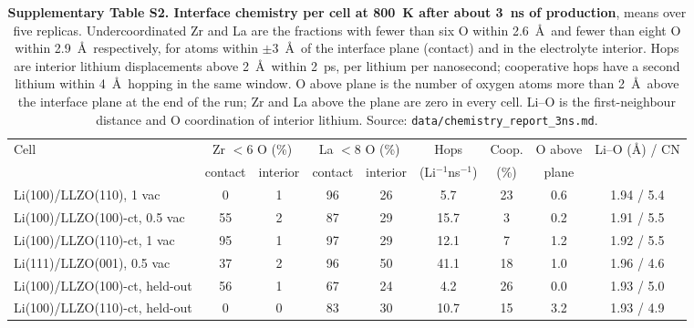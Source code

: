 \begin{table}[htbp]
\centering
\caption{\textbf{Supplementary Table S2. Interface chemistry per cell at 800~K
after about 3~ns of production}, means over five replicas. Undercoordinated Zr
and La are the fractions with fewer than six O within 2.6~\AA\ and fewer than
eight O within 2.9~\AA\ respectively, for atoms within $\pm3$~\AA\ of the
interface plane (contact) and in the electrolyte interior. Hops are interior
lithium displacements above 2~\AA\ within 2~ps, per lithium per nanosecond;
cooperative hops have a second lithium within 4~\AA\ hopping in the same
window. O above plane is the number of oxygen atoms more than 2~\AA\ above the
interface plane at the end of the run; Zr and La above the plane are zero in
every cell. Li--O is the first-neighbour distance and O coordination of
interior lithium. Source: \texttt{data/chemistry\_report\_3ns.md}.}
\label{tab:chemistry}
\small
\begin{tabular}{lcccccccc}
\toprule
Cell & \multicolumn{2}{c}{Zr $<6$ O (\%)} & \multicolumn{2}{c}{La $<8$ O (\%)} & Hops & Coop. & O above & Li--O (\AA) / CN \\
 & contact & interior & contact & interior & (Li$^{-1}$ns$^{-1}$) & (\%) & plane & \\
\midrule
Li(100)/LLZO(110), 1 vac            & 0  & 1 & 96 & 26 & 5.7  & 23 & 0.6 & 1.94 / 5.4 \\
Li(100)/LLZO(100)-ct, 0.5 vac       & 55 & 2 & 87 & 29 & 15.7 & 3  & 0.2 & 1.91 / 5.5 \\
Li(100)/LLZO(110)-ct, 1 vac         & 95 & 1 & 97 & 29 & 12.1 & 7  & 1.2 & 1.92 / 5.5 \\
Li(111)/LLZO(001), 0.5 vac          & 37 & 2 & 96 & 50 & 41.1 & 18 & 1.0 & 1.96 / 4.6 \\
Li(100)/LLZO(100)-ct, held-out      & 56 & 1 & 67 & 24 & 4.2  & 26 & 0.0 & 1.93 / 5.0 \\
Li(100)/LLZO(110)-ct, held-out      & 0  & 0 & 83 & 30 & 10.7 & 15 & 3.2 & 1.93 / 4.9 \\
\bottomrule
\end{tabular}
\end{table}
